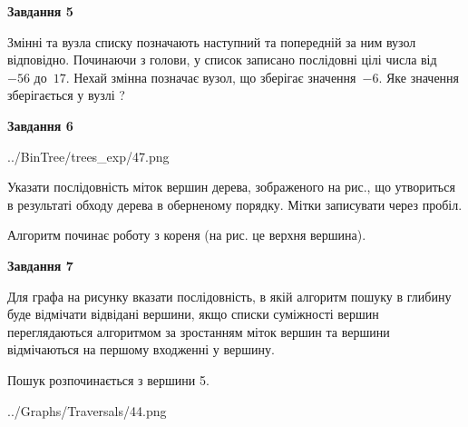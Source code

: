 \documentclass[12pt, ukrainian]{article}
\begin{document}
{\begin {large}
{\begin {center}\textbf{Завдання 5}\end {center}}\par
Змінні  та  вузла списку позначають наступний та попередній за ним вузол відповідно. Починаючи з голови, у список записано послідовні цілі числа від~$-56$ до~$17$. Нехай змінна  позначає вузол, що зберігає значення~$-6$.
Яке значення зберігається у вузлі  ?\par
\newpage

{\begin {center}\textbf{Завдання 6}\end {center}}\par

\begin{center}
	{../BinTree/trees_exp/47.png}
\end{center}
Указати послідовність міток вершин дерева, зображеного на рис., що утвориться в результаті обходу дерева в оберненому порядку. Мітки записувати через пробіл.\par Алгоритм починає роботу з кореня (на рис. це верхня вершина).\par
\newpage

{\begin {center}\textbf{Завдання 7}\end {center}}\par
Для графа на рисунку вказати послідовність, в якій алгоритм пошуку в глибину буде відмічати відвідані вершини, якщо списки суміжності вершин переглядаються алгоритмом за зростанням міток вершин та вершини відмічаються на першому вход\-женні у вершину.\par
Пошук розпочинається з вершини 5.\par

\begin{center}
	{../Graphs/Traversals/44.png}
\end{center}\par
\newpage


\end{large}}
\end{document}
